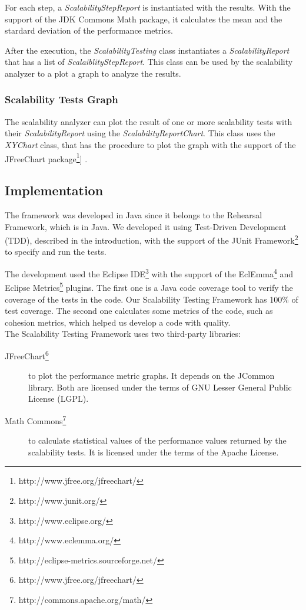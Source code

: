 For each step, a \emph{ScalabilityStepReport} is instantiated with the results. With the support of the JDK Commons Math package, it calculates the mean and the stardard deviation of the performance metrics.

After the execution, the \emph{ScalabilityTesting} class instantiates a \emph{ScalabilityReport} that has a list of \emph{ScalaiblityStepReport}. This class can be used by the scalability analyzer to a plot a graph to analyze the results.

\subsubsection{Scalability Tests Graph}
The scalability analyzer can plot the result of one or more scalability tests with their \emph{ScalabilityReport} using the \emph{ScalabilityReportChart}. This class uses the \emph{XYChart} class, that has the procedure to plot the graph with the support of the JFreeChart package\footnote{http://www.jfree.org/jfreechart/}] .


\subsection{Implementation}

The framework was developed in Java since it belongs to the Rehearsal Framework, which is in Java. We developed it using Test-Driven Development (TDD), described in the introduction, with the support of the JUnit Framework\footnote{http://www.junit.org/} to specify and run the tests.

The development used the Eclipse IDE\footnote{http://www.eclipse.org/} with the support of the EclEmma\footnote{http://www.eclemma.org/} and Eclipse Metrics\footnote{http://eclipse-metrics.sourceforge.net/} plugins. The first one is a Java code coverage tool to verify the coverage of the tests in the code. Our Scalability Testing Framework has 100\% of test coverage. The second one calculates some metrics of the code, such as cohesion metrics, which helped us develop a code with quality.\\

The Scalability Testing Framework uses two third-party libraries:
\begin{description}
\item[JFreeChart\footnote{http://www.jfree.org/jfreechart/}] to plot the performance metric graphs. It depends on the JCommon library. Both are licensed under the terms of GNU Lesser General Public License (LGPL). 
\item[Math Commons\footnote{http://commons.apache.org/math/}] to calculate statistical values of the performance values returned by the scalability tests. It is licensed under the terms of the Apache License.
\end{description}

